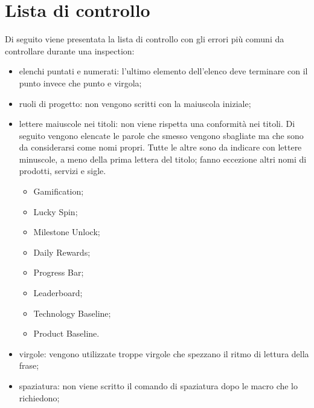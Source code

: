 \section {Lista di controllo}
Di seguito viene presentata la lista di controllo con gli errori più comuni da controllare
durante una inspection:

\begin{itemize}
		\item elenchi puntati e numerati: l'ultimo elemento dell'elenco deve terminare con il punto invece che punto e virgola;
		\item ruoli di progetto: non vengono scritti con la maiuscola iniziale;
		\item lettere maiuscole nei titoli: non viene rispetta una conformità nei titoli. Di seguito vengono elencate le parole che smesso vengono sbagliate ma che sono da considerarsi come nomi propri. Tutte le altre sono da indicare con lettere minuscole, a meno della prima lettera del titolo; fanno eccezione altri nomi di prodotti, servizi e sigle.
		\begin{itemize}
			\item Gamification;
			\item Lucky Spin;
			\item Milestone Unlock;
			\item Daily Rewards;
			\item Progress Bar;
			\item Leaderboard;
			\item Technology Baseline;
			\item Product Baseline.
		\end{itemize}
		\item virgole: vengono utilizzate troppe virgole che spezzano il ritmo di lettura della
frase;
		\item spaziatura: non viene scritto il comando di spaziatura dopo le macro che lo
richiedono;
	
\end{itemize}